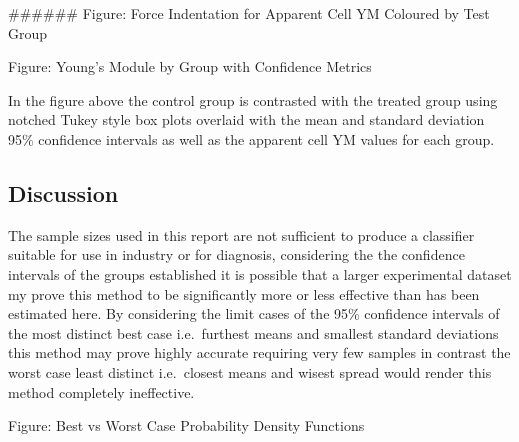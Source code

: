 \documentclass[
  paper=a4,
  ,captions=tableheading
]{scrartcl}
\makeatletter
\newcommand*\pandocbounded[1]{%
  \sbox\pandoc@box{#1}%
  \Gscale@div\@tempa{\textheight}{\dimexpr\ht\pandoc@box+\dp\pandoc@box\relax}%
  \Gscale@div\@tempb{\linewidth}{\wd\pandoc@box}%
  \ifdim\@tempb\p@<\@tempa\p@\let\@tempa\@tempb\fi%
  \ifdim\@tempa\p@<\p@\scalebox{\@tempa}{\usebox\pandoc@box}%
  \else\usebox{\pandoc@box}%
  \fi%
}
\makeatother
\begin{document}
\#\#\#\#\#\# Figure: Force Indentation for Apparent Cell YM Coloured by
Test Group

\pandocbounded{}

Figure: Young's Module by Group with Confidence Metrics

\pandocbounded{}

In the figure above the control group is contrasted with the treated
group using notched Tukey style box plots overlaid with the mean and
standard deviation 95\% confidence intervals as well as the apparent
cell YM values for each group.

\pandocbounded{}\pandocbounded{}

\subsection{Discussion}\label{discussion}

The sample sizes used in this report are not sufficient to produce a
classifier suitable for use in industry or for diagnosis, considering
the the confidence intervals of the groups established it is possible
that a larger experimental dataset my prove this method to be
significantly more or less effective than has been estimated here. By
considering the limit cases of the 95\% confidence intervals of the most
distinct best case i.e.~furthest means and smallest standard deviations
this method may prove highly accurate requiring very few samples in
contrast the worst case least distinct i.e.~closest means and wisest
spread would render this method completely ineffective.

Figure: Best vs Worst Case Probability Density Functions

\pandocbounded{}
\end{document}
